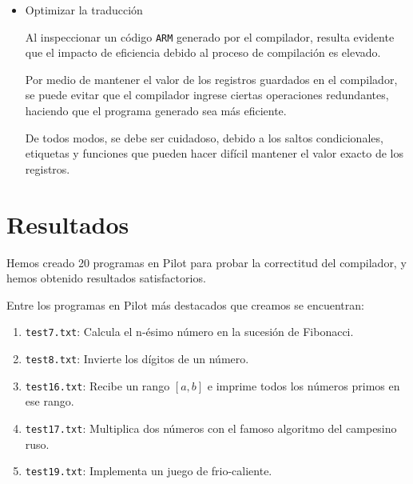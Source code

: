 \documentclass[12pt,spanish]{article}
\begin{document}
\begin{itemize}
\item{Optimizar la traducción}

Al inspeccionar un código \texttt{ARM} generado por el compilador, resulta evidente que el impacto de eficiencia debido al proceso de compilación es elevado.

Por medio de mantener el valor de los registros guardados en el compilador, se puede evitar que el compilador ingrese ciertas operaciones redundantes, haciendo que el programa generado sea más eficiente.

De todos modos, se debe ser cuidadoso, debido a los saltos condicionales, etiquetas y funciones que pueden hacer difícil mantener el valor exacto de los registros.

\end{itemize}

\section{Resultados}
Hemos creado 20 programas en Pilot para probar la correctitud del compilador, y hemos obtenido resultados satisfactorios.

\noindent
Entre los programas en Pilot más destacados que creamos se encuentran:
\begin{enumerate}
\item{\texttt{test7.txt}: Calcula el n-ésimo número en la sucesión de Fibonacci.}
\item{\texttt{test8.txt}: Invierte los dígitos de un número.}
\item{\texttt{test16.txt}: Recibe un rango $[a, b]$ e imprime todos los números primos en ese rango.}
\item{\texttt{test17.txt}: Multiplica dos números con el famoso algoritmo del campesino ruso.}
\item{\texttt{test19.txt}: Implementa un juego de frio-caliente.}
\end{enumerate}
 
\end{document}
